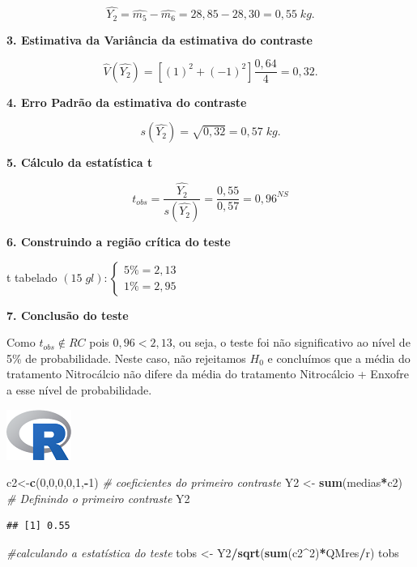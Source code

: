 \documentclass[
]{book}
\newenvironment{Shaded}{\begin{snugshade}}{\end{snugshade}}
\newcommand{\CommentTok}[1]{\textcolor[rgb]{0.56,0.35,0.01}{\textit{#1}}}
\newcommand{\DecValTok}[1]{\textcolor[rgb]{0.00,0.00,0.81}{#1}}
\newcommand{\KeywordTok}[1]{\textcolor[rgb]{0.13,0.29,0.53}{\textbf{#1}}}
\newcommand{\NormalTok}[1]{#1}
\newcommand{\OperatorTok}[1]{\textcolor[rgb]{0.81,0.36,0.00}{\textbf{#1}}}
\newcommand{\StringTok}[1]{\textcolor[rgb]{0.31,0.60,0.02}{#1}}
\begin{document}
\[
\hat{Y_2} = \hat{m_5} - \hat{m_6}=28,85-28,30 = 0,55\;kg.
\]

\textbf{3. Estimativa da Variância da estimativa do contraste}

\[
\hat{V}(\hat{Y_2}) = [(1)^2+(-1)^2]\frac{0,64}{4} = 0,32.
\]

\textbf{4. Erro Padrão da estimativa do contraste}

\[
s(\hat{Y_2}) = \sqrt{0,32} = 0,57\;kg.
\]

\textbf{5. Cálculo da estatística t }

\[
t_{obs} = \frac{\hat{Y_2}}{s(\hat{Y_2})} = \frac{0,55}{0,57} = 0,96^{NS}
\]

\textbf{6. Construindo a região crítica do teste}

t tabelado \((15\; gl): \begin{cases} 5\%=2,13 \\ 1\% = 2,95\end{cases}\)

\textbf{7. Conclusão do teste}

Como \(t_{obs} \not\in RC\) pois \(0,96 < 2,13\), ou seja, o teste foi não significativo ao nível de 5\% de probabilidade. Neste caso, não rejeitamos \(H_0\) e concluímos que a média do tratamento Nitrocálcio não difere da média do tratamento Nitrocálcio + Enxofre a esse nível de probabilidade.

\includegraphics{Rlogo.png}

\begin{Shaded}
\begin{Highlighting}[]
\NormalTok{c2<-}\KeywordTok{c}\NormalTok{(}\DecValTok{0}\NormalTok{,}\DecValTok{0}\NormalTok{,}\DecValTok{0}\NormalTok{,}\DecValTok{0}\NormalTok{,}\DecValTok{1}\NormalTok{,}\OperatorTok{-}\DecValTok{1}\NormalTok{) }\CommentTok{# coeficientes do primeiro contraste}
\NormalTok{Y2 <-}\StringTok{ }\KeywordTok{sum}\NormalTok{(medias}\OperatorTok{*}\NormalTok{c2) }\CommentTok{# Definindo o primeiro contraste}
\NormalTok{Y2}
\end{Highlighting}
\end{Shaded}

\begin{verbatim}
## [1] 0.55
\end{verbatim}

\begin{Shaded}
\begin{Highlighting}[]
\CommentTok{#calculando a estatística do teste}
\NormalTok{tobs <-}\StringTok{ }\NormalTok{Y2}\OperatorTok{/}\KeywordTok{sqrt}\NormalTok{(}\KeywordTok{sum}\NormalTok{(c2}\OperatorTok{^}\DecValTok{2}\NormalTok{)}\OperatorTok{*}\NormalTok{QMres}\OperatorTok{/}\NormalTok{r)}
\NormalTok{tobs}
\end{Highlighting}
\end{Shaded}
\end{document}
